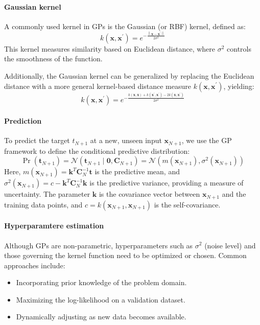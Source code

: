 \paragraph*{Gaussian kernel}
A commonly used kernel in GPs is the Gaussian (or RBF) kernel, defined as:
\[k(\mathbf{x},\mathbf{x}^\prime)=e^{-\frac{\left\lVert \mathbf{x}-\mathbf{x}^\prime\right\rVert}{2\sigma^2} }\]
This kernel measures similarity based on Euclidean distance, where $\sigma^2$ controls the smoothness of the function.

Additionally, the Gaussian kernel can be generalized by replacing the Euclidean distance with a more general kernel-based distance measure $k (\mathbf{x},\mathbf{x}^\prime)$, yielding:
\[k(\mathbf{x},\mathbf{x}^\prime)=e^{-\frac{k (\mathbf{x},\mathbf{x})+k (\mathbf{x}^\prime,\mathbf{x}^\prime)-2k (\mathbf{x},\mathbf{x}^\prime)}{2\sigma^2} }\]

\paragraph*{Prediction}
To predict the target $t_{N+1}$ at a new, unseen input $\mathbf{x}_{N+1}$, we use the GP framework to define the conditional predictive distribution:
\[\Pr(\mathbf{t}_{N+1})=\mathcal{N}(\mathbf{t}_{N+1}\mid\mathbf{0},\mathbf{C}_{N+1})=\mathcal{N}(m(\mathbf{x}_{N+1}),\sigma^2(\mathbf{x}_{N+1}))\]
Here, $m(\mathbf{x}_{N+1})=\mathbf{k}^T\mathbf{C}_N^{-1}\mathbf{t}$ is the predictive mean, and $\sigma^2(\mathbf{x}_{N+1})=c-\mathbf{k}^T\mathbf{C}_N^{-1}\mathbf{k}$ is the predictive variance, providing a measure of uncertainty.
The parameter $\mathbf{k}$ is the covariance vector between $\mathbf{x}_{N+1}$ and the training data points, and $c=k(\mathbf{x}_{N+1},\mathbf{x}_{N+1})$ is the self-covariance.

\paragraph*{Hyperparamtere estimation}
Although GPs are non-parametric, hyperparameters such as $\sigma^2$ (noise level) and those governing the kernel function need to be optimized or chosen. Common approaches include:
\begin{itemize}
    \item Incorporating prior knowledge of the problem domain.
    \item Maximizing the log-likelihood on a validation dataset.
    \item Dynamically adjusting as new data becomes available.
\end{itemize}

